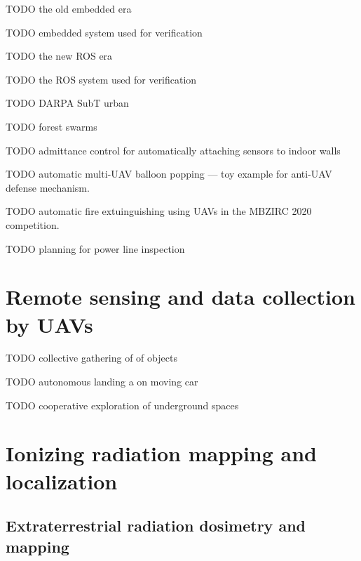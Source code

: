 \documentclass[a4paper,11pt,titlepage,twoside]{book}
\newcommand{\todo}[1]{{\color{red} TODO {#1}}}
\begin{document}
\todo{the old embedded era}
\cite{baca2016embedded} %
\cite{saska2017system} %

\todo{embedded system used for verification}
\cite{spurny2016complex} %
\cite{chudoba2016exploration} %
\cite{saska2016formations} %

\todo{the new ROS era}
\cite{baca2018model}
\cite{baca2020mrs}

\todo{the ROS system used for verification}
\cite{saska2017documentation}
\cite{faigl2017onsolution}
\cite{giernacki2019realtime}
\cite{petracek2020bioinspired}
\cite{saska2020formation}
\cite{saikin2020wildfire}


\todo{DARPA SubT urban}
\cite{kratky2020autonomous2} %

\todo{forest swarms}
\cite{dmytruk2020safe}
\cite{ahmad2020autonomous}

\todo{admittance control for automatically attaching sensors to indoor walls}
\cite{smrcka2020admittance}

\todo{automatic multi-UAV balloon popping --- toy example for anti-UAV defense mechanism.}
\cite{stasinchuk2020multiuav}

\todo{automatic fire extuinguishing using UAVs in the MBZIRC 2020 competition.}
\cite{walter2020extinguishing}

\todo{planning for power line inspection}
\cite{silano2020power}

\section{Remote sensing and data collection by UAVs}

\todo{collective gathering of of objects}
\cite{spurny2019cooperative}
\cite{loianno2018localization}

\todo{autonomous landing a on moving car}
\cite{baca2017autonomous}
\cite{baca2019autonomous}

\todo{cooperative exploration of underground spaces}
\cite{roucek2019darpa}
\cite{petrlik2020robust}

\section{Ionizing radiation mapping and localization}

\subsection{Extraterrestrial radiation dosimetry and mapping}
\end{document}
